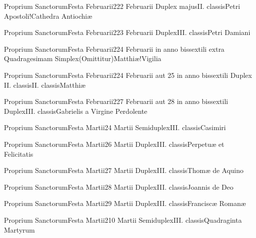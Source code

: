 \documentclass[invitatoriale-romanum.tex]{subfiles}
\begin{document}
	{Proprium Sanctorum}{Festa Februarii}{2}{22 Februarii}
	{Duplex majus}{II. classis}{Petri Apostoli!Cathedra Antiochiæ}
	{}
	{}

	{Proprium Sanctorum}{Festa Februarii}{2}{23 Februarii}
	{Duplex}{III. classis}{Petri Damiani}
	{}
	{}

	{Proprium Sanctorum}{Festa Februarii}{2}{24 Februarii in anno bissextili extra Quadragesimam}
	{Simplex}{(Omittitur)}{Matthiæ!Vigilia}
	{}
	{}
\invitferia

	{Proprium Sanctorum}{Festa Februarii}{2}{24 Februarii aut 25 in anno bissextili}
	{Duplex II. classis}{II. classis}{Matthiæ}
	{}
	{}

	{Proprium Sanctorum}{Festa Februarii}{2}{27 Februarii aut 28 in anno bissextili}
	{Duplex}{III. classis}{Gabrielis a Virgine Perdolente\linebreak\null}
	{}
	{}



	{Proprium Sanctorum}{Festa Martii}{2}{4 Martii}
	{Semiduplex}{III. classis}{Casimiri}
	{}
	{}

	{Proprium Sanctorum}{Festa Martii}{2}{6 Martii}
	{Duplex}{III. classis}{Perpetuæ et Felicitatis}
	{}
	{}

	{Proprium Sanctorum}{Festa Martii}{2}{7 Martii}
	{Duplex}{III. classis}{Thomæ de Aquino}
	{}
	{}

	{Proprium Sanctorum}{Festa Martii}{2}{8 Martii}
	{Duplex}{III. classis}{Joannis de Deo}
	{}
	{}

	{Proprium Sanctorum}{Festa Martii}{2}{9 Martii}
	{Duplex}{III. classis}{Franciscæ Romanæ}
	{}
	{}

	{Proprium Sanctorum}{Festa Martii}{2}{10 Martii}
	{Semiduplex}{III. classis}{Quadraginta Martyrum}
	{}
	{}
\end{document}
